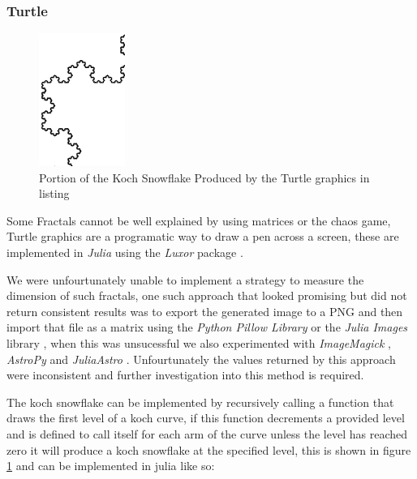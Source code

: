 \documentclass[a4paper,11pt,twoside]{article}
\begin{document}
\subsubsection{Turtle}
\label{turtle}
\begin{figure}
\centering
\includegraphics[width=0.25\textwidth]{../Problems/Chaos/Spirals/snowCurve.png}
\caption{\label{snow-turtle}Portion of the Koch Snowflake Produced by the Turtle graphics in listing }
\end{figure}


Some Fractals cannot be well explained by using matrices or the chaos game, Turtle graphics are a programatic way to draw a pen across a screen, these are implemented in \emph{Julia} using the \emph{Luxor} package \cite{JuliaGraphicsLuxorJl2020}.



We were unfourtunately unable to implement a strategy to measure the dimension
of such fractals, one such approach that looked promising but did not return
consistent results was to export the generated image to a PNG and then import
that file as a matrix using the \emph{Python Pillow Library} \cite{PillowPillowPIL} or
the \emph{Julia Images} library \cite{JuliaImagesImagesJl2020}, when this was
unsucessful we also experimented with \emph{ImageMagick} \cite{llcImageMagick},
\emph{AstroPy} \cite{Astropy} and \emph{JuliaAstro} \cite{JuliaAstroJuliaAstro}.
Unfourtunately the values returned by this approach were inconsistent and
further investigation into this method is required.

The koch snowflake can be implemented by recursively calling a function that draws the first level of a koch curve, if this function decrements a provided level and is defined to call itself for each arm of the curve unless the level has reached zero it will produce a koch snowflake at the specified level, this is shown in figure \ref{snow-turtle} and can be implemented in julia like so:
\end{document}
